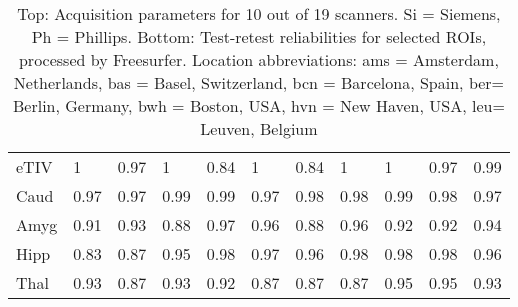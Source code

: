 \begin{table}
\begin{tabular}{lllllllllll}
eTIV &      1 &   0.97 &      1 &   0.84 &                     1 &   0.84 &                     1 &      1 &   0.97 &   0.99 \\
Caud                       &   0.97 &   0.97 &   0.99 &   0.99 &                  0.97 &   0.98 &                  0.98 &   0.99 &   0.98 &   0.97 \\
Amyg                      &   0.91 &   0.93 &   0.88 &   0.97 &                  0.96 &   0.88 &                  0.96 &   0.92 &   0.92 &   0.94 \\
Hipp                   &   0.83 &   0.87 &   0.95 &   0.98 &                  0.97 &   0.96 &                  0.98 &   0.98 &   0.98 &   0.96 \\
Thal               &   0.93 &   0.87 &   0.93 &   0.92 &                  0.87 &   0.87 &                  0.87 &   0.95 &   0.95 &   0.93 \\
\bottomrule
\end{tabular}
\caption{Top: Acquisition parameters for 10 out of 19 scanners. Si = Siemens, Ph = Phillips. Bottom: Test-retest reliabilities for selected ROIs, processed by Freesurfer. Location abbreviations: ams = Amsterdam, Netherlands, bas = Basel, Switzerland, bcn = Barcelona, Spain, ber= Berlin, Germany, bwh = Boston, USA, hvn = New Haven, USA, leu= Leuven, Belgium } 
\label{tab:acquisition1}

\end{table}
